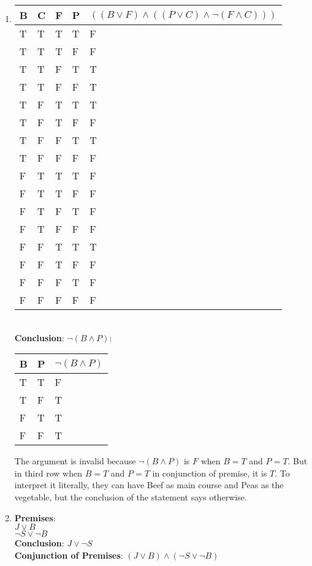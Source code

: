 \begin{solution}
\begin{enumerate}[label=(\alph*)]
        \item {
            \begin{tabular}[c]{l l l l | l}
                B & C & F & P & $((B \vee F) \wedge ((P \vee C) \wedge \neg(F \wedge C )))$ \\ \hline
                T & T & T & T & F \\
                T & T & T & F & F \\
                T & T & F & T & T \\
                T & T & F & F & T \\
                T & F & T & T & T \\
                T & F & T & F & F \\
                T & F & F & T & T \\
                T & F & F & F & F \\
                F & T & T & T & F \\
                F & T & T & F & F \\
                F & T & F & T & F \\
                F & T & F & F & F \\
                F & F & T & T & T \\
                F & F & T & F & F \\
                F & F & F & T & F \\
                F & F & F & F & F
            \end{tabular}
            \\
            \textbf{Conclusion}: $\neg(B \wedge P)$:
            \begin{tabular}[c]{l l | l}
                B & P & $\neg(B \wedge P)$ \\ \hline
                T & T & F \\
                T & F & T \\
                F & T & T \\
                F & F & T
            \end{tabular}
            
            The argument is invalid because $\neg(B \wedge P)$ is $F$ when $B = T$ and $P = T$. But in third row when $B = T$ and $P = T$ in conjunction of premise, it is $T$. To interpret it literally, they can have Beef as main course and Peas as the vegetable, but the conclusion of the statement says otherwise.
        }
        
        \item {
            \textbf{Premises}: \\
                $J \vee B$ \\
                $\neg S \vee \neg B$ \\
            \textbf{Conclusion}: $J \vee \neg S$ \\
            \textbf{Conjunction of Premises}: $(J \vee B) \wedge (\neg S \vee \neg B)$ \\
        
}
\end{enumerate}
\end{solution}
